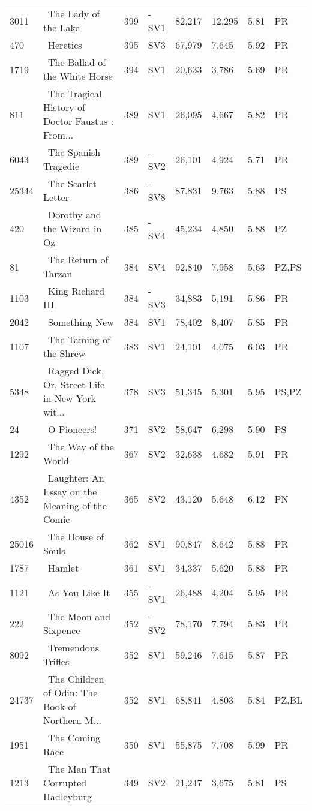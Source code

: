 \begin{longtable}{l | l | l | l | l | l | l | l}
3011 & ~The Lady of the Lake & 399 & -SV1 & 82,217 & 12,295 & 5.81 & PR\\
470 & ~Heretics & 395 & SV3 & 67,979 & 7,645 & 5.92 & PR\\
1719 & ~The Ballad of the White Horse & 394 & SV1 & 20,633 & 3,786 & 5.69 & PR\\
811 & ~The Tragical History of Doctor Faustus
: From... & 389 & SV1 & 26,095 & 4,667 & 5.82 & PR\\
6043 & ~The Spanish Tragedie & 389 & -SV2 & 26,101 & 4,924 & 5.71 & PR\\
25344 & ~The Scarlet Letter & 386 & -SV8 & 87,831 & 9,763 & 5.88 & PS\\
420 & ~Dorothy and the Wizard in Oz & 385 & -SV4 & 45,234 & 4,850 & 5.88 & PZ\\
81 & ~The Return of Tarzan & 384 & SV4 & 92,840 & 7,958 & 5.63 & PZ,PS\\
1103 & ~King Richard III & 384 & -SV3 & 34,883 & 5,191 & 5.86 & PR\\
2042 & ~Something New & 384 & SV1 & 78,402 & 8,407 & 5.85 & PR\\
1107 & ~The Taming of the Shrew & 383 & SV1 & 24,101 & 4,075 & 6.03 & PR\\
5348 & ~Ragged Dick, Or, Street Life in New York wit... & 378 & SV3 & 51,345 & 5,301 & 5.95 & PS,PZ\\
24 & ~O Pioneers! & 371 & SV2 & 58,647 & 6,298 & 5.90 & PS\\
1292 & ~The Way of the World & 367 & SV2 & 32,638 & 4,682 & 5.91 & PR\\
4352 & ~Laughter: An Essay on the Meaning of the Comic & 365 & SV2 & 43,120 & 5,648 & 6.12 & PN\\
25016 & ~The House of Souls & 362 & SV1 & 90,847 & 8,642 & 5.88 & PR\\
1787 & ~Hamlet & 361 & SV1 & 34,337 & 5,620 & 5.88 & PR\\
1121 & ~As You Like It & 355 & -SV1 & 26,488 & 4,204 & 5.95 & PR\\
222 & ~The Moon and Sixpence & 352 & -SV2 & 78,170 & 7,794 & 5.83 & PR\\
8092 & ~Tremendous Trifles & 352 & SV1 & 59,246 & 7,615 & 5.87 & PR\\
24737 & ~The Children of Odin: The Book of Northern M... & 352 & SV1 & 68,841 & 4,803 & 5.84 & PZ,BL\\
1951 & ~The Coming Race & 350 & SV1 & 55,875 & 7,708 & 5.99 & PR\\
1213 & ~The Man That Corrupted Hadleyburg & 349 & SV2 & 21,247 & 3,675 & 5.81 & PS\\

\end{longtable}

